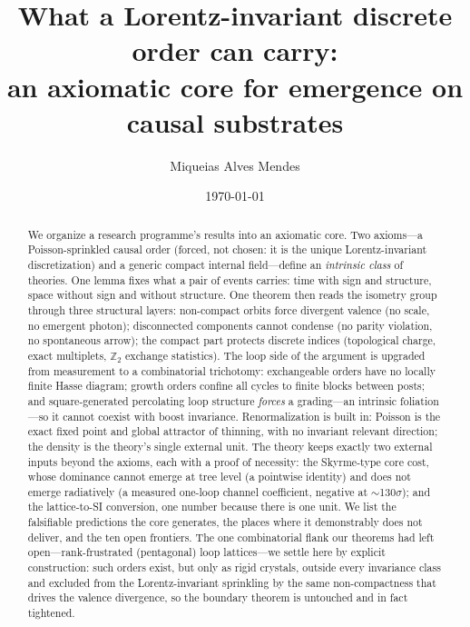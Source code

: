 \documentclass[aps,prd,reprint,nofootinbib,superscriptaddress,floatfix]{revtex4-2}
\theoremstyle{definition}
\begin{document}
\title{What a Lorentz-invariant discrete order can carry:\\
an axiomatic core for emergence on causal substrates}

\author{Miqueias Alves Mendes}
\date{\today}

\begin{abstract}
We organize a research programme's results into an axiomatic core. Two axioms---a
Poisson-sprinkled causal order (forced, not chosen: it is the unique Lorentz-invariant
discretization) and a generic compact internal field---define an \emph{intrinsic class}
of theories. One lemma fixes what a pair of events carries: time with sign and structure,
space without sign and without structure. One theorem then reads the isometry group
through three structural layers: non-compact orbits force divergent valence (no scale,
no emergent photon); disconnected components cannot condense (no parity violation, no
spontaneous arrow); the compact part protects discrete indices (topological charge,
exact multiplets, $\mathbb{Z}_2$ exchange statistics). The loop side of the argument is
upgraded from measurement to a combinatorial trichotomy: exchangeable orders have no
locally finite Hasse diagram; growth orders confine all cycles to finite blocks between
posts; and square-generated percolating loop structure \emph{forces} a grading---an
intrinsic foliation---so it cannot coexist with boost invariance. Renormalization is
built in: Poisson is the exact fixed point and global attractor of thinning, with no
invariant relevant direction; the density is the theory's single external unit. The
theory keeps exactly two external inputs beyond the axioms, each with a proof of
necessity: the Skyrme-type core cost, whose dominance cannot emerge at tree level (a
pointwise identity) and does not emerge radiatively (a measured one-loop channel
coefficient, negative at $\sim$130$\sigma$); and the lattice-to-SI conversion, one number
because there is one unit. We list the falsifiable predictions the core generates, the
places where it demonstrably does not deliver, and the ten open frontiers. The one
combinatorial flank our theorems had left open---rank-frustrated (pentagonal) loop
lattices---we settle here by explicit construction: such orders exist, but only as rigid
crystals, outside every invariance class and excluded from the Lorentz-invariant
sprinkling by the same non-compactness that drives the valence divergence, so the
boundary theorem is untouched and in fact tightened.
\end{abstract}
\end{document}
